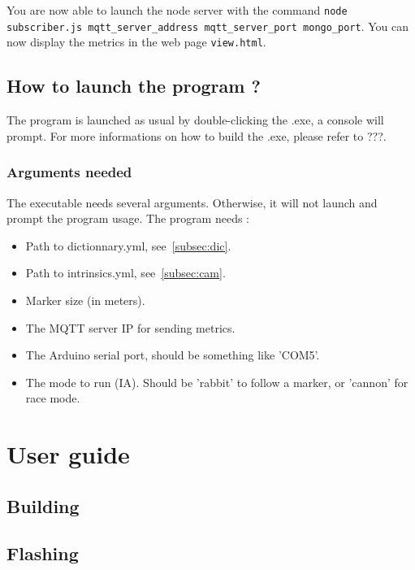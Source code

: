 \documentclass[a4paper,11pt]{report}
\begin{document}
You are now able to launch the node server with the command \texttt{node
subscriber.js mqtt\_server\_address mqtt\_server\_port mongo\_port}. You can
now display the metrics in the web page \texttt{view.html}.

\section{How to launch the program ?}

The program is launched as usual by double-clicking the .exe, a console will
prompt. 
For more informations on how to build the .exe, please refer to ???.

\subsection{Arguments needed}

The executable needs several arguments. Otherwise, it will not launch and
prompt the program usage.
The program needs :

\begin{itemize}
    \item Path to dictionnary.yml, see~\ref{subsec:dic}.
    \item Path to intrinsics.yml, see~\ref{subsec:cam}.
    \item Marker size (in meters).
    \item The MQTT server IP for sending metrics.
    \item The Arduino serial port, should be something like 'COM5'.
    \item The mode to run (IA). Should be 'rabbit' to follow a marker, or 'cannon' for race mode.
\end{itemize}





\chapter{User guide}

\section{Building}

\section{Flashing}
\label{sec:Flashing} %
\end{document}
